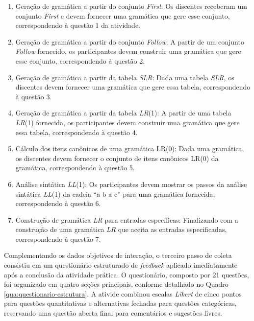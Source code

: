 \begin{enumerate}[label=\arabic*.]
	\item Geração de gramática a partir do conjunto \textit{First}: Os discentes receberam um conjunto \textit{First} e devem fornecer uma gramática que gere esse conjunto, correspondendo à questão 1 da atividade.

	\item Geração de gramática a partir do conjunto \textit{Follow}: A partir de um conjunto \textit{Follow} fornecido, os participantes devem construir uma gramática que gere esse conjunto, correspondendo à questão 2.

	\item Geração de gramática a partir da tabela \textit{SLR}: Dada uma tabela \textit{SLR}, os discentes devem fornecer uma gramática que gere essa tabela, correspondendo à questão 3.

	\item Geração de gramática a partir da tabela \textit{LR}(1): A partir de uma tabela \textit{LR}(1) fornecida, os participantes devem construir uma gramática que gere essa tabela, correspondendo à questão 4.

	\item Cálculo dos itens canônicos de uma gramática LR(0): Dada uma gramática, os discentes devem fornecer o conjunto de itens canônicos LR(0) da gramática, correspondendo à questão 5.

	\item Análise sintática \textit{LL}(1): Os participantes devem mostrar os passos da análise sintática \textit{LL}(1) da cadeia ``a b a c'' para uma gramática fornecida, correspondendo à questão 6.

	\item Construção de gramática \textit{LR} para entradas específicas: Finalizando com a construção de uma gramática \textit{LR} que aceita as entradas especificadas, correspondendo à questão 7.
\end{enumerate}


Complementando os dados objetivos de interação, o terceiro passo de coleta consistiu em um questionário estruturado de \textit{feedback} aplicado imediatamente após a conclusão da atividade prática. O questionário, composto por 21 questões, foi organizado em quatro seções principais, conforme detalhado no Quadro \ref{qua:questionario-estrutura}. A ativide combinou escalas \textit{Likert} de cinco pontos para questões quantitativas e alternativas fechadas para questões categóricas, reservando uma questão aberta final para comentários e sugestões livres.

